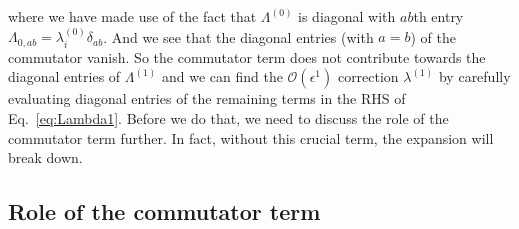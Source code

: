 %
where we have made use of the fact that $\Lambda^{(0)}$ is diagonal with $ab$th entry $\Lambda_{0,ab} = \lambda^{(0)}_{i}\delta_{ab}$.
And we see that the diagonal entries (with $a=b$) of the commutator vanish.
So the commutator term does not contribute towards the diagonal entries of $\Lambda^{(1)}$ and we can find the $\mathcal{O}(\epsilon^{1})$ correction $\lambda^{(1)}$ by carefully evaluating diagonal entries of the remaining terms in the RHS of Eq.~\eqref{eq:Lambda1}.
Before we do that, we need to discuss the role of the commutator term further.
In fact, without this crucial term, the expansion will break down.

\subsection{Role of the commutator term}

